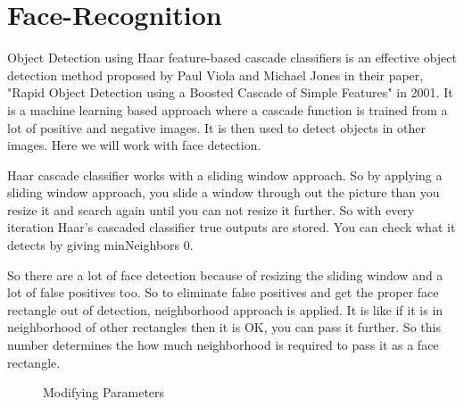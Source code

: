 \documentclass{article}
\begin{document}
\section{Face-Recognition}
Object Detection using Haar\cite{opencv} feature-based cascade classifiers is an effective object detection method proposed by Paul Viola and Michael Jones in their paper, "Rapid Object Detection using a Boosted Cascade of Simple Features" in 2001. It is a machine learning based approach where a cascade function is trained from a lot of positive and negative images. It is then used to detect objects in other images. Here we will work with face detection.

Haar cascade classifier works with a sliding window approach. So by applying a sliding window approach, you slide a window through out the picture than you resize it and search again until you can not resize it further. So with every iteration Haar's cascaded classifier true outputs are stored.  You can check what it detects by giving minNeighbors 0. 


So there are a lot of face detection because of resizing the sliding window and a lot of false positives too. So to eliminate false positives and get the proper face rectangle out of detection, neighborhood approach is applied. It is like if it is in neighborhood of other rectangles then it is OK, you can pass it further. So this number determines the how much neighborhood is required to pass it as a face rectangle. 

\begin{figure}[!h]
	\centering
	\hspace{0 pt}
	\caption{Modifying Parameters}
	\label{fig:results}
\end{figure}
\end{document}
